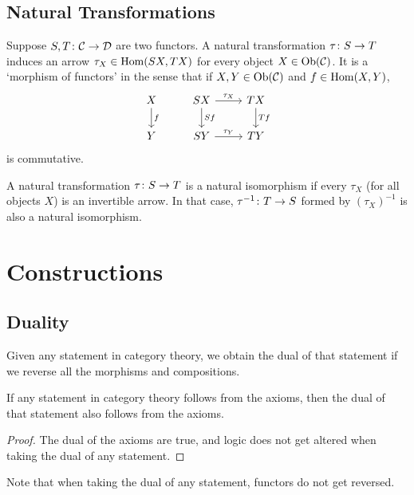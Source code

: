 \subsection*{Natural Transformations}

\begin{definition}
    Suppose \(S,T\colon\mathcal{C}\to\mathcal{D}\) are two functors.
    A natural transformation \(\tau\colon S\to T\)
    induces an arrow \(\tau_X \in \operatorname{Hom}(SX,TX)\) for every object \(X \in \operatorname{Ob}(\mathcal{C})\).
    It is a `morphism of functors' in the sense that
    if \(X,Y \in \operatorname{Ob}(\mathcal{C})\) and \(f \in \operatorname{Hom}(X,Y)\),
    \begin{equation*}
        \begin{tikzcd}
            X \arrow{d}{f} & SX \arrow{d}{Sf} \arrow{r}{\tau_X} & TX \arrow{d}{Tf} \\
            Y & SY \arrow{r}{\tau_Y} & TY
        \end{tikzcd}
    \end{equation*}
    is commutative.
\end{definition}
\begin{definition}
    A natural transformation \(\tau\colon S\to T\) is a natural isomorphism
    if every \(\tau_X\) (for all objects \(X\)) is an invertible arrow.
    In that case, \(\tau^{-1}\colon T\to S\) formed by \({(\tau_X)}^{-1}\) is also a natural isomorphism.
\end{definition}

\section{Constructions}

\subsection*{Duality}

\begin{definition}
    Given any statement in category theory,
    we obtain the dual of that statement
    if we reverse all the morphisms and compositions.
\end{definition}
\begin{theorem}
    If any statement in category theory follows from the axioms,
    then the dual of that statement also follows from the axioms.
\end{theorem}
\begin{proof}
    The dual of the axioms are true, and logic does not get altered when taking the dual of any statement.
\end{proof}
\begin{remark}
    Note that when taking the dual of any statement, functors do not get reversed.
\end{remark}


